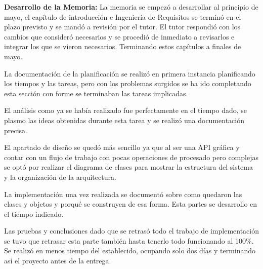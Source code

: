 \textbf{Desarrollo de la Memoria:}
La memoria se empezó a desarrollar al principio de mayo, el capítulo de introducción e Ingeniería de Requisitos se terminó en el plazo previsto y se mandó a revisión por el tutor. El tutor respondió con los cambios que consideró necesarios y se procedió de inmediato a revisarlos e integrar los que se vieron necesarios. Terminando estos capítulos a finales de mayo.

La documentación de la planificación se realizó en primera instancia planificando los tiempos y las tareas, pero con los problemas surgidos se ha ido completando esta sección con forme se terminaban las tareas implicadas.

El análisis como ya se había realizado fue perfectamente en el tiempo dado, se plasmo las ideas obtenidas durante esta tarea y se realizó una documentación precisa.

El apartado de diseño se quedó más sencillo ya que al ser una API gráfica y contar con un flujo de trabajo con pocas operaciones de procesado pero complejas se optó por realizar el diagrama de clases para mostrar la estructura del sistema y la organización de la arquitectura.

La implementación una vez realizada se documentó sobre como quedaron las clases y objetos y porqué se construyen de esa forma. Esta partes se desarrollo en el tiempo indicado.

Las pruebas y conclusiones dado que se retrasó todo el trabajo de implementación se tuvo que retrasar esta parte también hasta tenerlo todo funcionando al 100\%. Se realizó en menos tiempo del establecido, ocupando solo dos días y terminando así el proyecto antes de la entrega.

